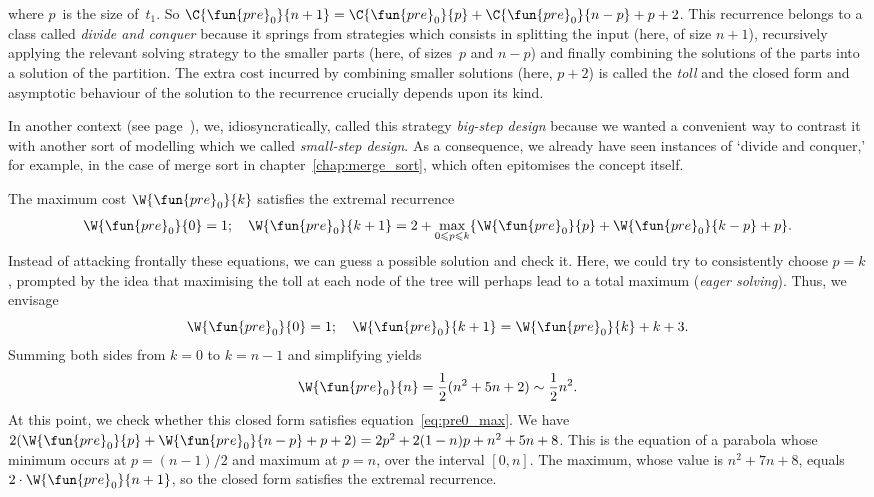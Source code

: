 where \(p\)~is the size of~\(t_1\). So \(\C{\fun{pre}_0}{n+1} =
\C{\fun{pre}_0}{p} + \C{\fun{pre}_0}{n-p} + p + 2\). This recurrence
belongs to a class called \emph{divide and conquer}
  because it springs from strategies which
consists in splitting the input (here, of size \(n+1\)), recursively
applying the relevant solving strategy to the smaller parts (here, of
sizes~\(p\) and \(n-p\)) and finally combining the solutions of the
parts into a solution of the partition. The extra cost incurred by
combining smaller solutions (here, \(p+2\)) is called the
\emph{toll} and the closed form and asymptotic behaviour
of the solution to the recurrence crucially depends upon its kind.

In another context (see page~\pageref{big-step}), we,
idiosyncratically, called this strategy \emph{big\hyp{}step design}
 because we wanted a convenient way to
contrast it with another sort of modelling which we called
\emph{small\hyp{}step design}. As a
consequence, we already have seen instances of `divide and conquer,'
for example, in the case of merge sort in
chapter~\vref{chap:merge_sort}, which often epitomises the concept
itself.

The maximum cost
\(\W{\fun{pre}_0}{k}\) satisfies the
extremal recurrence
\begin{equation}
\W{\fun{pre}_0}{0} = 1;\quad
\W{\fun{pre}_0}{k+1} =
  2 + \max_{0 \leqslant p \leqslant k}\{\W{\fun{pre}_0}{p}
                                  + \W{\fun{pre}_0}{k-p} + p\}.
\index{pre0@$\W{\fun{pre}_0}{n}$}
\label{eq:pre0_max}
\end{equation}
Instead of attacking frontally these equations, we can guess a
possible solution and check it. Here, we could try to consistently
choose \(p=k\), prompted by the idea that maximising the toll at each
node of the tree will perhaps lead to a total maximum (\emph{eager
  solving}). Thus, we envisage
\begin{equation}
\W{\fun{pre}_0}{0} = 1;\quad
\W{\fun{pre}_0}{k+1} = \W{\fun{pre}_0}{k} + k + 3.
\label{eq:max_pre0_rec}
\end{equation}
Summing both sides from \(k=0\) to \(k=n-1\) and simplifying yields
\begin{equation*}
\W{\fun{pre}_0}{n} = \frac{1}{2}(n^2 + 5n + 2) \sim \frac{1}{2}n^2.
\end{equation*}
At this point, we check whether this closed form satisfies
equation~\eqref{eq:pre0_max}. We have \(2(\W{\fun{pre}_0}{p} +
\W{\fun{pre}_0}{n-p} + p + 2) = 2p^2 + 2(1-n)p + n^2 + 5n + 8\). This
is the equation of a parabola whose minimum occurs at \(p = (n-1)/2\)
and maximum at \(p = n\), over the interval \([0,n]\). The maximum,
whose value is \(n^2 + 7n + 8\), equals \(2 \cdot
\W{\fun{pre}_0}{n+1}\), so the closed form satisfies the extremal
recurrence.


